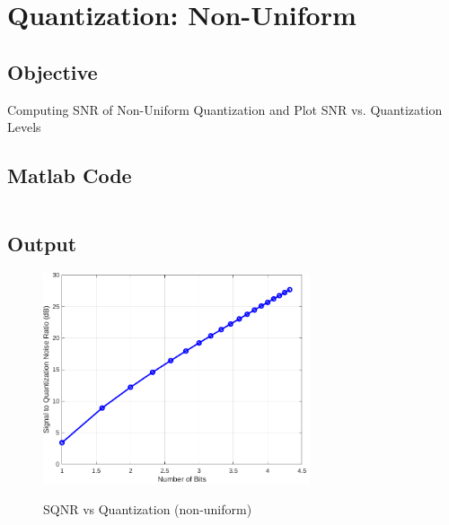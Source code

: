 \pagebreak
\section{Quantization: Non-Uniform}
\label{sec:Quantization: Non-Uniform}

\subsection{Objective}
Computing SNR of Non-Uniform Quantization and Plot SNR vs. Quantization Levels

\subsection{Matlab Code}

\inputminted[fontsize=\footnotesize,autogobble]{matlab}{code/sqnr2.m}
\subsection{Output}

\begin{figure}[!htb]
	\centering
	\includegraphics[width=0.7\textwidth]{res/figures/Figure_4.pdf}
	\label{output:SQNR vs quantization 2}
	\caption{SQNR vs Quantization (non-uniform)}
\end{figure}